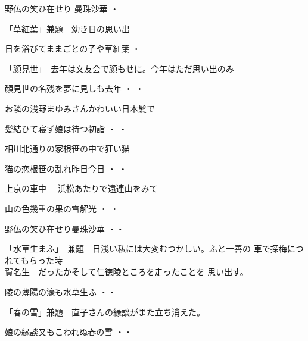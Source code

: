 \documentclass[b5paper]{tbook}
\begin{document}
\begin{shiika}
野仏の笑ひ在せり 曼珠沙華\hfill {  ・  }
\end{shiika}
\vspace{0.6cm}
「草紅葉」兼題　幼き日の思い出　
\begin{shiika}
 日を浴びてままごとの子や草紅葉\hfill {  ・  }
\end{shiika}
\vspace{0.6cm}
「顔見世」　去年は文友会で顔もせに。今年はただ思い出のみ
\begin{shiika}
顔見世の名残を夢に見しも去年\hfill {  ・  ・}
\end{shiika}
\vspace{0.6cm}
お隣の浅野まゆみさんかわいい日本髪で
\begin{shiika}
髪結ひて寝ず娘は待つ初詣\hfill {  ・  ・}
\end{shiika}
\vspace{0.6cm}
相川北通りの家根笹の中で狂い猫
\begin{shiika}
猫の恋根笹の乱れ昨日今日\hfill {  ・  ・}
\end{shiika}
\vspace{0.6cm}
上京の車中　
浜松あたりで遠連山をみて
\begin{shiika}
山の色幾重の果の雪解光\hfill {  ・  ・ }	
\end{shiika}


\vspace{0.6cm}
\begin{shiika}野仏の笑ひ在せり曼珠沙華
\hfill{・・}\end{shiika}
\vspace{0.6cm}
「水草生まふ」　兼題　日浅い私には大変むつかしい。ふと一善の
車で探梅につれてもらった時\\賀名生　だったかそして仁徳陵ところを走ったことを
思い出す。
\begin{shiika}陵の薄陽の濠も水草生ふ
\hfill{・・}\end{shiika}



\vspace{0.6cm}
「春の雪」兼題　直子さんの縁談がまた立ち消えた。
\begin{shiika}娘の縁談又もこわれぬ春の雪
\hfill{・・}\end{shiika}
\end{document}
